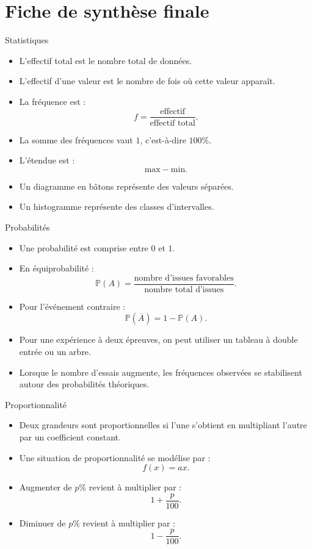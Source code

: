 \documentclass[11pt,a4paper]{article}
\newcommand{\Prob}{\mathbb{P}}
\begin{document}
\newpage

\section{Fiche de synthèse finale}

\begin{retenirbox}{Statistiques}
\begin{itemize}
    \item L'effectif total est le nombre total de données.
    \item L'effectif d'une valeur est le nombre de fois où cette valeur apparaît.
    \item La fréquence est :
    \[
    f=\frac{\text{effectif}}{\text{effectif total}}.
    \]
    \item La somme des fréquences vaut $1$, c'est-à-dire $100\%$.
    \item L'étendue est :
    \[
    \text{max}-\text{min}.
    \]
    \item Un diagramme en bâtons représente des valeurs séparées.
    \item Un histogramme représente des classes d'intervalles.
\end{itemize}
\end{retenirbox}

\begin{retenirbox}{Probabilités}
\begin{itemize}
    \item Une probabilité est comprise entre $0$ et $1$.
    \item En équiprobabilité :
    \[
    \Prob(A)=\frac{\text{nombre d'issues favorables}}{\text{nombre total d'issues}}.
    \]
    \item Pour l'événement contraire :
    \[
    \Prob(\overline{A})=1-\Prob(A).
    \]
    \item Pour une expérience à deux épreuves, on peut utiliser un tableau à double entrée ou un arbre.
    \item Lorsque le nombre d'essais augmente, les fréquences observées se stabilisent autour des probabilités théoriques.
\end{itemize}
\end{retenirbox}

\begin{retenirbox}{Proportionnalité}
\begin{itemize}
    \item Deux grandeurs sont proportionnelles si l'une s'obtient en multipliant l'autre par un coefficient constant.
    \item Une situation de proportionnalité se modélise par :
    \[
    f(x)=ax.
    \]
    \item Augmenter de $p\%$ revient à multiplier par :
    \[
    1+\frac{p}{100}.
    \]
    \item Diminuer de $p\%$ revient à multiplier par :
    \[
    1-\frac{p}{100}.
    \]
\end{itemize}
\end{retenirbox}
\end{document}

